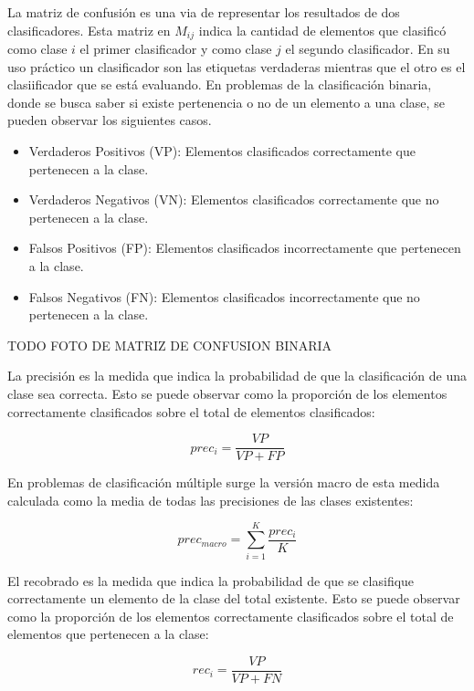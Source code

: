 La matriz de confusión es una via de representar los resultados de dos clasificadores. Esta matriz en $M_{ij}$ 
indica la cantidad de elementos que clasificó como clase $i$ el primer clasificador y
como clase $j$ el segundo clasificador. En su uso práctico
un clasificador son las etiquetas verdaderas mientras que el otro es el clasiificador que se está evaluando. 
En problemas de la clasificación binaria, donde se busca saber si existe pertenencia o no de un elemento a una clase,
se pueden observar los siguientes casos.

\begin{itemize}
	\item Verdaderos Positivos (VP): Elementos clasificados correctamente que pertenecen a la clase.
	\item Verdaderos Negativos (VN): Elementos clasificados correctamente que no pertenecen a la clase.
	\item Falsos Positivos (FP): Elementos clasificados incorrectamente que pertenecen a la clase.
	\item Falsos Negativos (FN): Elementos clasificados incorrectamente que no pertenecen a la clase.
\end{itemize}

TODO FOTO DE MATRIZ DE CONFUSION BINARIA

La precisión es la medida que indica la probabilidad de que la clasificación de una clase sea correcta. Esto 
se puede observar como la proporción de los elementos correctamente clasificados sobre el total de 
elementos clasificados:

\begin{equation}
	prec_i = \frac{VP}{VP + FP}
\end{equation}

En problemas de clasificación múltiple surge la versión macro de esta medida calculada como la media de todas
las precisiones de las clases existentes:

\begin{equation}
	prec_{macro} = \sum^K_{i=1} \frac{prec_i}{K}
\end{equation}

El recobrado es la medida que indica la probabilidad de que se clasifique correctamente un elemento de la clase
del total existente. Esto se puede observar como la proporción de los elementos correctamente clasificados sobre el 
total de elementos que pertenecen a la clase:

\begin{equation}
	rec_i = \frac{VP}{VP + FN}
\end{equation}

